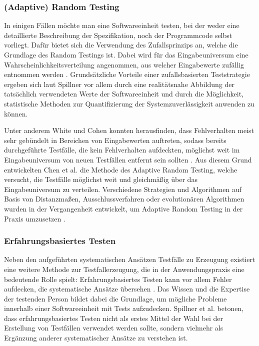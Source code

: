\subsubsection{(Adaptive) Random Testing}\label{subsub:randomTesting}

In einigen Fällen möchte man eine Softwareeinheit testen, bei der weder eine detaillierte Beschreibung der Spezifikation, noch der Programmcode selbst vorliegt. Dafür bietet sich die Verwendung des Zufallsprinzips an, welche die Grundlage des Random Testings ist. Dabei wird für das Eingabeuniversum eine Wahrscheinlichkeitsverteilung angenommen, aus welcher Eingabewerte zufällig entnommen werden \cite[S. 141 f.]{spillner2011software}. Grundsätzliche Vorteile einer zufallsbasierten Teststrategie ergeben sich laut Spillner \cite[S. 142]{spillner2011software} vor allem durch eine realitätsnahe Abbildung der tatsächlich verwendeten Werte der Softwareeinheit und durch die Möglichkeit, statistische Methoden zur Quantifizierung der Systemzuverlässigkeit anwenden zu können.

Unter anderem White und Cohen \cite{white1980domain} konnten herausfinden, dass Fehlverhalten meist sehr gebündelt in Bereichen von Eingabewerten auftreten, sodass bereits durchgeführte Testfälle, die kein Fehlverhalten aufdeckten, möglichst weit im Eingabeuniversum von neuen Testfällen entfernt sein sollten \cite{survey2013}. Aus diesem Grund entwickelten Chen et al. \cite{chen2004adaptive} die Methode des Adaptive Random Testing, welche versucht, die Testfälle möglichst weit und gleichmäßig über das Eingabeuniversum zu verteilen. Verschiedene Strategien und Algorithmen auf Basis von Distanzmaßen, Ausschlussverfahren oder evolutionären Algorithmen wurden in der Vergangenheit entwickelt, um Adaptive Random Testing in der Praxis umzusetzen \cite{huang2012adaptive}.

\subsubsection{Erfahrungsbasiertes Testen}\label{subsub:erfahrungsbasiertesTesten}

Neben den aufgeführten systematischen Ansätzen Testfälle zu Erzeugung existiert eine weitere Methode zur Testfallerzeugung, die in der Anwendungspraxis eine bedeutende Rolle spielt: Erfahrungsbasiertes Testen kann vor allem Fehler aufdecken, die systematische Ansätze übersehen \cite[S. 210]{spillner2010basiswissen}. Das Wissen und die Expertise der testenden Person bildet dabei die Grundlage, um mögliche Probleme innerhalb einer Softwareeinheit mit Tests aufzudecken. Spillner et al. \cite[S. 213]{spillner2010basiswissen} betonen, dass erfahrungsbasiertes Testen nicht als erstes Mittel der Wahl bei der Erstellung von Testfällen verwendet werden sollte, sondern vielmehr als Ergänzung anderer systematischer Ansätze zu verstehen ist. 

